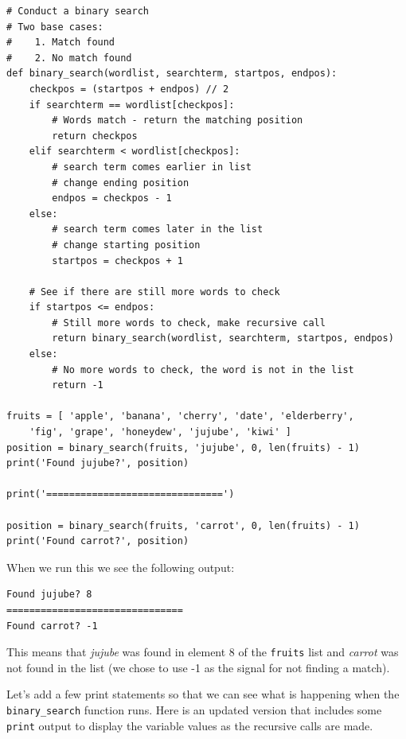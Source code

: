 \beforeverb
\begin{verbatim}
# Conduct a binary search
# Two base cases:
#    1. Match found
#    2. No match found
def binary_search(wordlist, searchterm, startpos, endpos):
    checkpos = (startpos + endpos) // 2
    if searchterm == wordlist[checkpos]:
        # Words match - return the matching position
        return checkpos
    elif searchterm < wordlist[checkpos]:
        # search term comes earlier in list
        # change ending position
        endpos = checkpos - 1
    else:
        # search term comes later in the list
        # change starting position
        startpos = checkpos + 1

    # See if there are still more words to check
    if startpos <= endpos:
        # Still more words to check, make recursive call
        return binary_search(wordlist, searchterm, startpos, endpos)
    else:
        # No more words to check, the word is not in the list
        return -1

fruits = [ 'apple', 'banana', 'cherry', 'date', 'elderberry',
    'fig', 'grape', 'honeydew', 'jujube', 'kiwi' ]
position = binary_search(fruits, 'jujube', 0, len(fruits) - 1)
print('Found jujube?', position)
    
print('===============================')

position = binary_search(fruits, 'carrot', 0, len(fruits) - 1)
print('Found carrot?', position)
\end{verbatim}
\afterverb

When we run this we see the following output:

\beforeverb
\begin{verbatim}
Found jujube? 8
===============================
Found carrot? -1
\end{verbatim}
\afterverb

This means that \textit{jujube} was found in element 8 of the \texttt{fruits} list and \textit{carrot} was not found in the list (we chose to use -1 as the signal for not finding a match).

Let's add a few print statements so that we can see what is happening when the \texttt{binary\_search} function runs. Here is an updated version that includes some \texttt{print} output to display the variable values as the recursive calls are made. 


